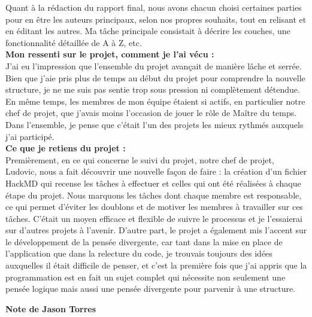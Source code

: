 \documentclass[11pt]{article}
\begin{document}
Quant à la rédaction du rapport final, nous avons chacun choisi certaines parties pour en être les auteurs principaux, selon nos propres souhaits, tout en relisant et en éditant les autres. Ma tâche principale consistait à décrire les couches, une fonctionnalité détaillée de A à Z, etc.\\

\bigbreak
\textbf{ Mon ressenti sur le projet, comment je l’ai vécu :  }\\
J'ai eu l'impression que l'ensemble du projet avançait de manière lâche et serrée. Bien que j'aie pris plus de temps au début du projet pour comprendre la nouvelle structure, je ne me suis pas sentie trop sous pression ni complètement détendue. En même temps, les membres de mon équipe étaient si actifs, en particulier notre chef de projet, que j'avais moins l'occasion de jouer le rôle de Maître du temps. Dans l'ensemble, je pense que c'était l'un des projets les mieux rythmés auxquels j'ai participé.\\

\bigbreak
\textbf{ Ce que je retiens du projet :   }\\
Premièrement, en ce qui concerne le suivi du projet, notre chef de projet, Ludovic, nous a fait découvrir une nouvelle façon de faire : la création d'un fichier HackMD qui recense les tâches à effectuer et celles qui ont été réalisées à chaque étape du projet. Nous marquons les tâches dont chaque membre est responsable, ce qui permet d'éviter les doublons et de motiver les membres à travailler sur ces tâches. C'était un moyen efficace et flexible de suivre le processus et je l'essaierai sur d'autres projets à l'avenir. D'autre part, le projet a également mis l'accent sur le développement de la pensée divergente, car tant dans la mise en place de l'application que dans la relecture du code, je trouvais toujours des idées auxquelles il était difficile de penser, et c'est la première fois que j'ai appris que la programmation est en fait un sujet complet qui nécessite non seulement une pensée logique mais aussi une pensée divergente pour parvenir à une structure. 












\newpage
\textbf{\Large Note de Jason Torres}





\end{document}
